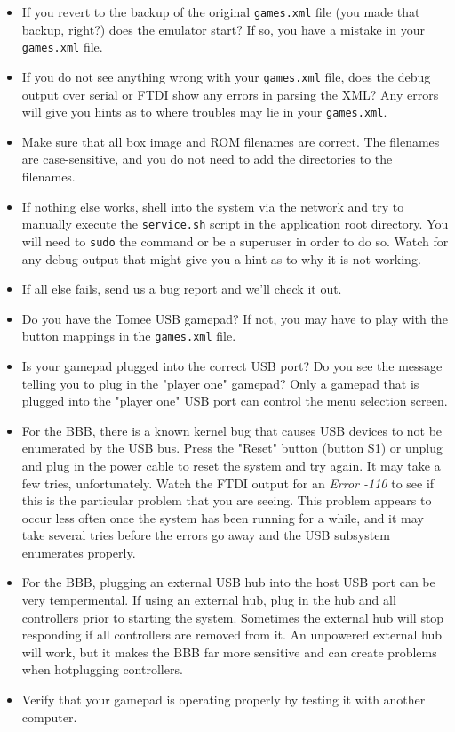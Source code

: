 
\begin{itemize}
\item If you revert to the backup of the original \texttt{games.xml} file (you made that backup, right?) does the emulator start?  If so, you have a mistake in your \texttt{games.xml} file.
\item If you do not see anything wrong with your \texttt{games.xml} file, does the debug output over serial or FTDI show any errors in parsing the XML? Any errors will give you hints as to where troubles may lie in your \texttt{games.xml}.
\item Make sure that all box image and ROM filenames are correct.  The filenames are case-sensitive, and you do not need to add the directories to the filenames.
\item If nothing else works, shell into the system via the network and try to manually execute the \texttt{service.sh} script in the application root directory.  You will need to \texttt{sudo} the command or be a superuser in order to do so.  Watch for any debug output that might give you a hint as to why it is not working.
\item If all else fails, send us a bug report and we'll check it out.
\end{itemize}


\begin{itemize}
\item Do you have the Tomee USB gamepad?  If not, you may have to play with the button mappings in the \texttt{games.xml} file.
\item Is your gamepad plugged into the correct USB port?  Do you see the message telling you to plug in the "player one" gamepad?  Only a gamepad that is plugged into the "player one" USB port can control the menu selection screen.
\item For the BBB, there is a known kernel bug that causes USB devices to not be enumerated by the USB bus.  Press the "Reset" button (button S1) or unplug and plug in the power cable to reset the system and try again.  It may take a few tries, unfortunately.  Watch the FTDI output for an \emph{Error -110} to see if this is the particular problem that you are seeing.  This problem appears to occur less often once the system has been running for a while, and it may take several tries before the errors go away and the USB subsystem enumerates properly.
\item For the BBB, plugging an external USB hub into the host USB port can be very tempermental.  If using an external hub, plug in the hub and all controllers prior to starting the system.  Sometimes the external hub will stop responding if all controllers are removed from it.  An unpowered external hub will work, but it makes the BBB far more sensitive and can create problems when hotplugging controllers.
\item Verify that your gamepad is operating properly by testing it with another computer.  
\end{itemize}

